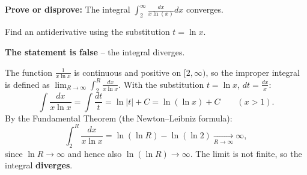 
\begin{question}
\textbf{Prove or disprove:} The integral $\int_2^\infty \frac{dx}{x\ln(x)}dx$ converges.
\end{question}

\begin{hint}
Find an antiderivative using the substitution $t=\ln x$.
\end{hint}

\begin{solution}
\textbf{The statement is false} -- the integral diverges.

The function $\frac{1}{x\ln x}$ is continuous and positive on $[2,\infty)$, so the improper integral is defined as $\lim_{R\to\infty}\int_2^R\frac{dx}{x\ln x}$.
With the substitution $t=\ln x$, $dt=\frac{dx}{x}$:
\[ \int\frac{dx}{x\ln x}=\int\frac{dt}{t}=\ln|t|+C=\ln(\ln x)+C \qquad (x>1). \]
By the Fundamental Theorem (the Newton--Leibniz formula):
\[ \int_2^R\frac{dx}{x\ln x}=\ln(\ln R)-\ln(\ln 2)\xrightarrow[R\to\infty]{}\infty, \]
since $\ln R\to\infty$ and hence also $\ln(\ln R)\to\infty$. The limit is not finite, so the integral \textbf{diverges}.
\end{solution}
